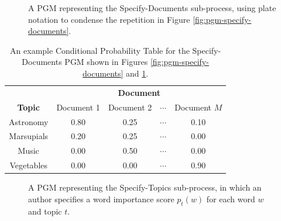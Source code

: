 \documentclass[11pt]{article}
\begin{document}
\begin{figure}[ht!]
	\centering
	\caption{A PGM representing the \textsf{Specify-Documents} sub-process, using plate notation to condense the repetition in Figure \ref{fig:pgm-specify-documents}.}
	\label{fig:pgm-specify-documents-plate}
\end{figure}

\begin{table}[ht!]
	\centering
	\begin{tabular}{ccccc}
		\toprule
		& \multicolumn{4}{c}{\textbf{Document}} \\
		\textbf{Topic} & Document 1 & Document 2 & $\cdots$ & Document $M$ \\
		\midrule
		Astronomy & 0.80 & 0.25 & $\cdots$ & 0.10 \\
		Marsupials & 0.20 & 0.25 & $\cdots$ & 0.00 \\
		Music & 0.00 & 0.50 & $\cdots$ & 0.00 \\
		Vegetables & 0.00 & 0.00 & $\cdots$ & 0.90 \\
	\end{tabular}
	\caption{An example Conditional Probability Table for the \textsf{Specify-Documents} PGM shown in Figures \ref{fig:pgm-specify-documents} and \ref{fig:pgm-specify-documents-plate}.}
	\label{tab:cpt-specify-documents}
\end{table}


\begin{figure}[ht!]
	\centering
	\caption{A PGM representing the \textsf{Specify-Topics} sub-process, in which an author specifies a word importance score $p_t(w)$ for each word $w$ and topic $t$.}
	\label{fig:pgm-specify-topics}
\end{figure}
\end{document}
